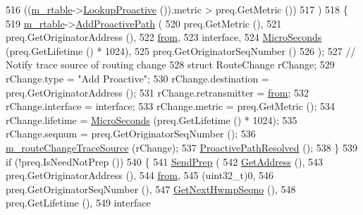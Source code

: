 \begin{DoxyCode}
516             ((\hyperlink{classns3_1_1dot11s_1_1HwmpProtocol_a12fda0e3e5a400888c8ba1a87c1a7216}{m\_rtable}->\hyperlink{classns3_1_1dot11s_1_1HwmpRtable_ad4bed27ab37ab1bc606802b763225a23}{LookupProactive} ()).metric > preq.GetMetric ())
517             )
518             \{
519               \hyperlink{classns3_1_1dot11s_1_1HwmpProtocol_a12fda0e3e5a400888c8ba1a87c1a7216}{m\_rtable}->\hyperlink{classns3_1_1dot11s_1_1HwmpRtable_adf74c1ad8e3bb8c8bcd9fda27018f542}{AddProactivePath} (
520                 preq.GetMetric (),
521                 preq.GetOriginatorAddress (),
522                 \hyperlink{lte__amc_8m_a1b4c81ff74eb1a626b5ade44c81004b3}{from},
523                 interface,
524                 \hyperlink{group__timecivil_ga17465a639c8d1464e76538afdd78a9f0}{MicroSeconds} (preq.GetLifetime () * 1024),
525                 preq.GetOriginatorSeqNumber ()
526                 );
527               \textcolor{comment}{// Notify trace source of routing change}
528               \textcolor{keyword}{struct }RouteChange rChange;
529               rChange.type = \textcolor{stringliteral}{"Add Proactive"};
530               rChange.destination = preq.GetOriginatorAddress ();
531               rChange.retransmitter = \hyperlink{lte__amc_8m_a1b4c81ff74eb1a626b5ade44c81004b3}{from};
532               rChange.interface = interface;
533               rChange.metric = preq.GetMetric ();
534               rChange.lifetime = \hyperlink{group__timecivil_ga17465a639c8d1464e76538afdd78a9f0}{MicroSeconds} (preq.GetLifetime () * 1024);
535               rChange.seqnum = preq.GetOriginatorSeqNumber ();
536               \hyperlink{classns3_1_1dot11s_1_1HwmpProtocol_aff5ca87b57430809a6b6ee25fa526948}{m\_routeChangeTraceSource} (rChange);
537               \hyperlink{classns3_1_1dot11s_1_1HwmpProtocol_ad6c9925336d3061cf5675cd459216883}{ProactivePathResolved} ();
538             \}
539           \textcolor{keywordflow}{if} (!preq.IsNeedNotPrep ())
540             \{
541               \hyperlink{classns3_1_1dot11s_1_1HwmpProtocol_a61cb0a88964f864c0cc8480160c4689b}{SendPrep} (
542                 \hyperlink{classns3_1_1dot11s_1_1HwmpProtocol_ab8b2c6d98ae278406f543e25feca8ccc}{GetAddress} (),
543                 preq.GetOriginatorAddress (),
544                 \hyperlink{lte__amc_8m_a1b4c81ff74eb1a626b5ade44c81004b3}{from},
545                 (uint32\_t)0,
546                 preq.GetOriginatorSeqNumber (),
547                 \hyperlink{classns3_1_1dot11s_1_1HwmpProtocol_a1b627657878666de9b9c913d82c35853}{GetNextHwmpSeqno} (),
548                 preq.GetLifetime (),
549                 interface

\end{DoxyCode}
